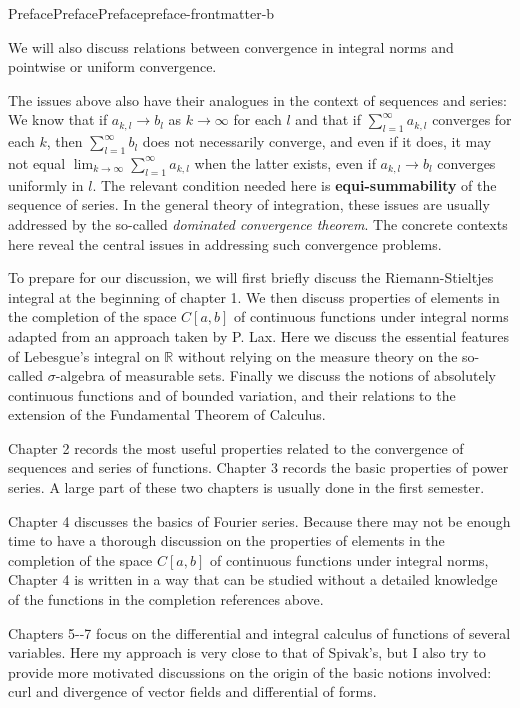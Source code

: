 \documentclass[oneside,10pt,]{book}
\newcommand{\terminology}[1]{\textbf{#1}}
\numberwithin{equation}{section}
\newcommand{\bbR}{\mathbb{R}}
\begin{document}
\begin{preface}{Preface}{Preface}{}{Preface}{}{}{preface-frontmatter-b}
\begin{itemize}[label=\textbullet]
\end{itemize}
We will also discuss relations between convergence in integral norms and pointwise or uniform convergence.%
\par
The issues above also have  their analogues in the context of sequences and series: We know  that if \(a_{k, l}\to b_{l}\) as \(k\to \infty\) for each \(l\) and that if \(\sum_{l=1}^{\infty}a_{k, l}\) converges for each \(k\), then \(\sum_{l=1}^{\infty}b_{l}\)  does not necessarily converge, and even if it does, it may not equal \(\lim_{k\to \infty} \sum_{l=1}^{\infty}a_{k, l}\) when the latter exists, even if \(a_{k, l}\to b_{l}\) converges uniformly in \(l\). The relevant condition needed here is \terminology{equi-summability} of the sequence of series. In the general theory of integration, these issues are usually addressed by the so-called \emph{dominated convergence theorem}. The concrete contexts here reveal the central issues in addressing such convergence problems.%
\par
To prepare for our discussion, we will first briefly discuss the Riemann-Stieltjes integral at the beginning of  chapter 1. We then discuss properties of elements in the completion of the space \(C[a, b]\) of continuous functions under integral norms adapted from an approach taken by P. Lax. Here we discuss the essential features of Lebesgue's integral on \(\bbR\) without relying on the measure theory on the so-called \(\sigma\)-algebra of measurable sets. Finally we discuss the notions of absolutely continuous functions and of bounded variation, and their relations to the extension of the Fundamental Theorem of Calculus.%
\par
Chapter 2 records the most useful properties related to the convergence of sequences and series of functions.  Chapter 3 records the basic properties of power series. A large part of these two chapters is usually done in the first semester.%
\par
Chapter 4 discusses the basics of Fourier series. Because there may not be enough time to have a thorough discussion on the properties of elements in the completion of the space \(C[a, b]\) of continuous functions under integral norms, Chapter 4 is written in a way that can be studied without a detailed knowledge of the functions in the completion references above.%
\par
Chapters 5-{}-{}7 focus on the differential and integral calculus of functions of several variables. Here my approach is very close to that of Spivak's, but I also try to provide more motivated discussions on the origin of the basic notions involved: curl and divergence of vector fields and differential of forms.%

\end{preface}
\end{document}

